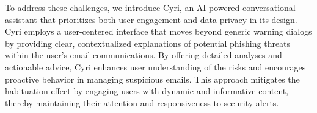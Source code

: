 To address these challenges, we introduce Cyri, an AI-powered conversational assistant that prioritizes both user engagement and data privacy in its design. Cyri employs a user-centered interface that moves beyond generic warning dialogs by providing clear, contextualized explanations of potential phishing threats within the user's email communications. By offering detailed analyses and actionable advice, Cyri enhances user understanding of the risks and encourages proactive behavior in managing suspicious emails. This approach mitigates the habituation effect by engaging users with dynamic and informative content, thereby maintaining their attention and responsiveness to security alerts. 



